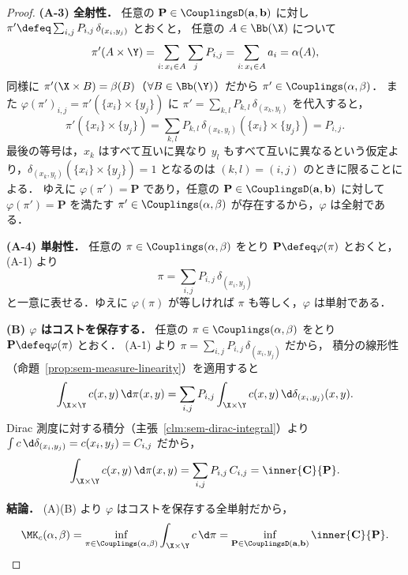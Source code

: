 \begin{proof}
  \medskip
  \textbf{(A-3) 全射性．}
  任意の $\mathbf{P} \in \CouplingsD(\mathbf{a},\mathbf{b})$ に対し
  $\pi' \defeq \sum_{i,j} P_{i,j}\,\delta_{(x_i,y_j)}$ とおくと，
  任意の $A \in \Bb(\X)$ について
  \[
    \pi'(A \times \Y)
    = \sum_{i:\,x_i \in A} \sum_j P_{i,j}
    = \sum_{i:\,x_i \in A} a_i
    = \alpha(A),
  \]
  同様に $\pi'(\X \times B) = \beta(B)$（$\forall B \in \Bb(\Y)$）だから
  $\pi' \in \Couplings(\alpha,\beta)$．
  また $\varphi(\pi')_{i,j} = \pi'(\{x_i\} \times \{y_j\})$ に $\pi' = \sum_{k,l} P_{k,l}\,\delta_{(x_k,y_l)}$ を代入すると，
  \[
    \pi'(\{x_i\} \times \{y_j\})
    = \sum_{k,l} P_{k,l}\,\delta_{(x_k,y_l)}(\{x_i\} \times \{y_j\})
    = P_{i,j}.
  \]
  最後の等号は，$x_k$ はすべて互いに異なり $y_l$ もすべて互いに異なるという仮定より，$\delta_{(x_k,y_l)}(\{x_i\}\times\{y_j\})=1$ となるのは $(k,l)=(i,j)$ のときに限ることによる．
  ゆえに $\varphi(\pi') = \mathbf{P}$ であり，任意の $\mathbf{P} \in \CouplingsD(\mathbf{a},\mathbf{b})$ に対して $\varphi(\pi') = \mathbf{P}$ を満たす $\pi' \in \Couplings(\alpha,\beta)$ が存在するから，$\varphi$ は全射である．

  \medskip
  \textbf{(A-4) 単射性．}
  任意の $\pi \in \Couplings(\alpha,\beta)$ をとり $\mathbf{P} \defeq \varphi(\pi)$ とおくと，
  (A-1) より
  \[
    \pi = \sum_{i,j} P_{i,j}\,\delta_{(x_i,y_j)}
  \]
  と一意に表せる．ゆえに $\varphi(\pi)$ が等しければ $\pi$ も等しく，$\varphi$ は単射である．

  \medskip
  \textbf{(B) $\varphi$ はコストを保存する．}
  任意の $\pi \in \Couplings(\alpha,\beta)$ をとり $\mathbf{P} \defeq \varphi(\pi)$ とおく．
  (A-1) より $\pi = \sum_{i,j} P_{i,j}\,\delta_{(x_i,y_j)}$ だから，
  積分の線形性（命題~\ref{prop:sem-measure-linearity}）を適用すると
  \[
    \int_{\X \times \Y} c(x, y)\, \d\pi(x, y)
    = \sum_{i,j} P_{i,j} \int_{\X \times \Y} c(x, y)\, \d\delta_{(x_i,y_j)}(x,y).
  \]
  Dirac 測度に対する積分（主張~\ref{clm:sem-dirac-integral}）より
  $\int c\,\d\delta_{(x_i,y_j)} = c(x_i,y_j) = C_{i,j}$ だから，
  \[
    \int_{\X \times \Y} c(x, y)\, \d\pi(x, y)
    = \sum_{i,j} P_{i,j}\, C_{i,j}
    = \inner{\mathbf{C}}{\mathbf{P}}.
  \]

  \medskip
  \textbf{結論．}
  (A)(B) より $\varphi$ はコストを保存する全単射だから，
  \[
    \MK_c(\alpha, \beta)
    = \inf_{\pi \in \Couplings(\alpha, \beta)}
      \int_{\X \times \Y} c\, \d\pi
    = \inf_{\mathbf{P} \in \CouplingsD(\mathbf{a}, \mathbf{b})}
      \inner{\mathbf{C}}{\mathbf{P}}.
  \]
\end{proof}

